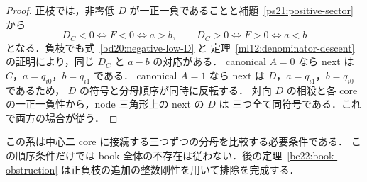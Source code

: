\begin{proof}
正枝では，非零低 $D$ が一正一負であることと補題~\ref{ps21:positive-sector} から
\[
 D_C<0\Longleftrightarrow F<0\Longleftrightarrow a>b,
 \qquad
 D_C>0\Longleftrightarrow F>0\Longleftrightarrow a<b
\]
となる．負枝でも式~\eqref{bd20:negative-low-D} と
定理~\ref{ml12:denominator-descent} の証明により，同じ $D_C$ と $a-b$ の対応がある．
canonical $A=0$ なら next は $C$，$a=q_{i0}$，$b=q_{i1}$ である．
canonical $A=1$ なら next は $D$，$a=q_{i1}$，$b=q_{i0}$ であるため，
$D$ の符号と分母順序が同時に反転する．
対向 $D$ の相殺と各 core の一正一負性から，node 三角形上の next の $D$ は
三つ全て同符号である．これで両方の場合が従う．
\end{proof}

この系は中心二 core に接続する三つずつの分母を比較する必要条件である．
この順序条件だけでは book 全体の不存在は従わない．後の定理~\ref{bc22:book-obstruction} は正負枝の追加の整数剛性を用いて排除を完成する．
